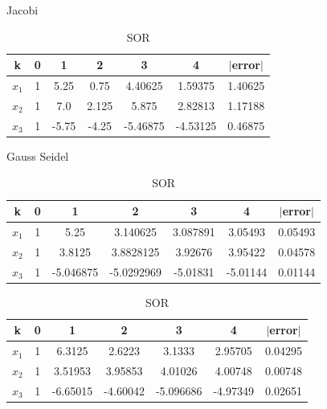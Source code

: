 \documentclass[12pt]{article}
\begin{document}
\begin{table}[h]
  \caption{Jacobi}
  \centering
\begin{tabular}{| c | c | c | c | c | c | c |}
\hline
k & 0 & 1 & 2 & 3 & 4 & $|$error$|$ \\ \hline
$x_1$ & 1 & 5.25  & 0.75  & 4.40625  & 1.59375  & 1.40625\\ \hline 
$x_2$ & 1 & 7.0   & 2.125 & 5.875    & 2.82813  & 1.17188 \\ \hline 
$x_3$ & 1 & -5.75 & -4.25 & -5.46875 & -4.53125 & 0.46875 \\ \hline 
\end{tabular}

\caption{Gauss Seidel}
\begin{tabular}{| c | c | c | c | c | c | c |}
\hline
k & 0 & 1 & 2 & 3 & 4 & $|$error$|$ \\ \hline
$x_1$ & 1 & 5.25 & 3.140625 & 3.087891 & 3.05493 & 0.05493\\ \hline 
$x_2$ & 1 & 3.8125 & 3.8828125 & 3.92676 & 3.95422 & 0.04578 \\ \hline 
$x_3$ & 1 & -5.046875 & -5.0292969 & -5.01831 & -5.01144 & 0.01144\\ \hline 
\end{tabular}

\caption{SOR}
\begin{tabular}{| c | c | c | c | c | c | c |}
\hline
k & 0 & 1 & 2 & 3 & 4 & $|$error$|$ \\ \hline
$x_1$ & 1 & 6.3125 & 2.6223 & 3.1333 & 2.95705 & 0.04295 \\ \hline 
$x_2$ & 1 & 3.51953 & 3.95853 & 4.01026 & 4.00748 & 0.00748 \\ \hline 
$x_3$ & 1 & -6.65015 & -4.60042 & -5.096686 & -4.97349 & 0.02651 \\ \hline 
\end{tabular}
\end{table}



 
\end{document}
